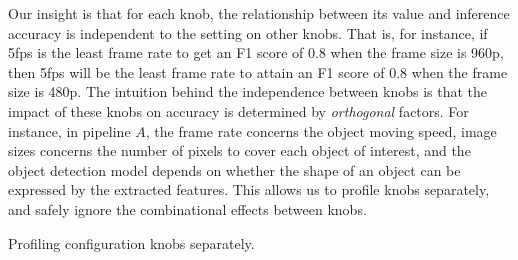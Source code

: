 Our insight is that 
for each knob, the relationship between its value and inference 
accuracy is independent to the setting on other knobs. 
That is, for instance, if 5fps is the least frame rate to get an F1 
score of 0.8 when the frame size is 960p, then 5fps will be the
least frame rate to attain an F1 score of 0.8 when the frame size 
is 480p.
The intuition behind the independence between knobs is that the 
impact of these knobs on accuracy is determined by {\em orthogonal} 
factors. 
For instance, in pipeline $A$, the frame rate concerns the object
moving speed, image sizes concerns the number of pixels to cover 
each object of interest, and the object detection model depends on 
whether the shape of an object can be expressed by the extracted 
features.
This allows us to profile knobs separately, and safely ignore the 
combinational effects between knobs.

\begin{algorithm}[t!]
\small
	\DontPrintSemicolon
	\caption{Profiling configuration knobs separately.}
	\label{alg:policy3}
\end{algorithm}

